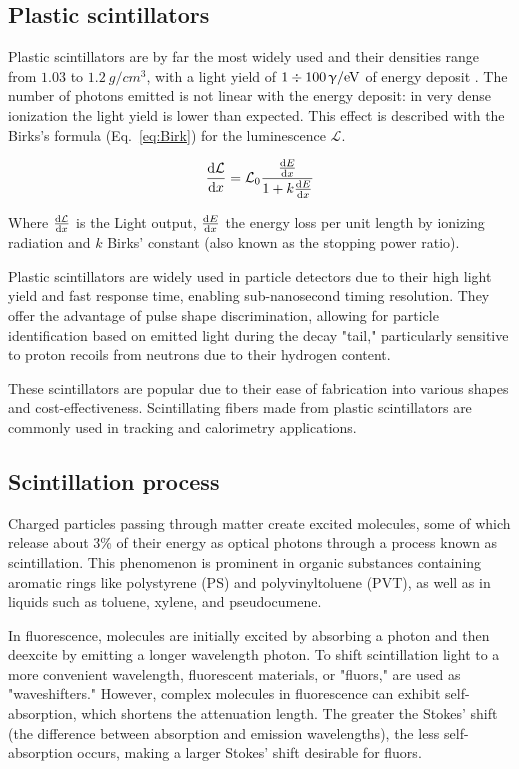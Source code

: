 \begin{refsection}
    \subsection{Plastic scintillators}
        Plastic scintillators are by far the most widely used and their densities range from $1.03$ to $\SI{1.2}{g\per cm^3}$, with a light yield of $1\divisionsymbol\SI{100}{\upgamma/eV}$ of energy deposit \cite{PDG}.
        The number of photons emitted is not linear with the energy deposit: in very dense ionization the light yield is lower than expected.
        This effect is described with the Birks's formula (Eq.~\ref{eq:Birk}) for the luminescence $\mathcal{L}$.

        \begin{equation}
            \dv{\mathcal{L}}{x} = \mathcal{L}_0 \frac{\dv{E}{x}}{1 + k \dv{E}{x}}
            \label{eq:Birk}
        \end{equation}

        Where $\dv{\mathcal{L}}{x}$ is the Light output, $\dv{E}{x}$ the energy loss per unit length by ionizing radiation and $k$ Birks' constant (also known as the stopping power ratio).

        Plastic scintillators are widely used in particle detectors due to their high light yield and fast response time, enabling sub-nanosecond timing resolution. They offer the advantage of pulse shape discrimination, allowing for particle identification based on emitted light during the decay "tail," particularly sensitive to proton recoils from neutrons due to their hydrogen content.

        These scintillators are popular due to their ease of fabrication into various shapes and cost-effectiveness. Scintillating fibers made from plastic scintillators are commonly used in tracking and calorimetry applications.

        \subsection{Scintillation process}
        Charged particles passing through matter create excited molecules, some of which release about 3\% of their energy as optical photons through a process known as scintillation. This phenomenon is prominent in organic substances containing aromatic rings like polystyrene (PS) and polyvinyltoluene (PVT), as well as in liquids such as toluene, xylene, and pseudocumene.

        In fluorescence, molecules are initially excited by absorbing a photon and then deexcite by emitting a longer wavelength photon. To shift scintillation light to a more convenient wavelength, fluorescent materials, or "fluors," are used as "waveshifters." However, complex molecules in fluorescence can exhibit self-absorption, which shortens the attenuation length. The greater the Stokes' shift (the difference between absorption and emission wavelengths), the less self-absorption occurs, making a larger Stokes' shift desirable for fluors.


\end{refsection}

